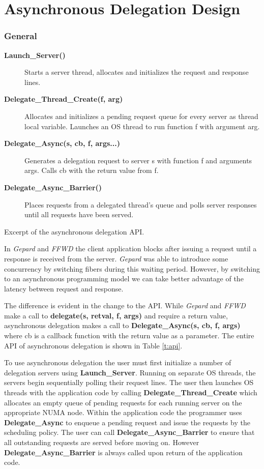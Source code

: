 \documentclass{uicthesi}
\begin{document}
\chapter{Asynchronous Delegation Design}
\subsection{General}
\begin{table}\small
  \begin{description}
  \item[\bf Launch\_Server()] Starts a server thread, allocates and initializes the request and response lines.
  \item[\bf Delegate\_Thread\_Create(f, arg)] Allocates and initializes a pending request queue for every server as thread local variable. Launches an OS thread to run function f with argument arg.   
  \item[\bf Delegate\_Async(s, cb, f, args...)]  Generates a delegation request to server s with function f and arguments args. Calls cb with the return value from f.
  \item[\bf Delegate\_Async\_Barrier()] Places requests from a delegated thread's queue and polls server responses until all requests have been served. 
\end{description}
\caption{Excerpt of the asynchronous delegation API. }
\label{t:api}
\end{table}
In \textit{Gepard} and \textit{FFWD} the client application blocks after issuing a request until a response is received from the server. \textit{Gepard} was able to introduce some concurrency by switching fibers during this waiting period. However, by switching to an asynchronous programming model we can take better advantage of the latency between request and response. 

The difference is evident in the change to the API. While \textit{Gepard} and \textit{FFWD} make a call to \textbf{delegate(s, retval, f, args)} and require a return value, asynchronous delegation makes a call to \textbf{Delegate\_Async(s, cb, f, args)} where cb is a callback function with the return value as a parameter. The entire API of asynchronous delegation is shown in Table \ref{t:api}. 

To use asynchronous delegation the user must first initialize a number of delegation servers using \textbf{Launch\_Server}. Running on separate OS threads, the servers begin sequentially polling their request lines. The user then launches OS threads with the application code by calling \textbf{Delegate\_Thread\_Create} which allocates an empty queue of pending requests for each running server on the appropriate NUMA node. Within the application code the programmer uses \textbf{Delegate\_Async} to enqueue a pending request and issue the requests by the scheduling policy. The user can call \textbf{Delegate\_Async\_Barrier} to ensure that all outstanding requests are served before moving on. However \textbf{Delegate\_Async\_Barrier} is always called upon return of the application code. 
\end{document}
